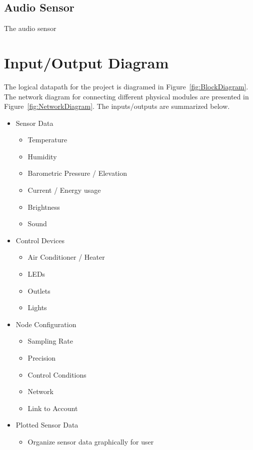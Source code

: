 		\subsection{Audio Sensor}
			The audio sensor %
		
	 \section{Input/Output Diagram}
		 The logical datapath for the project is diagramed in Figure~\ref{fig:BlockDiagram}. The network diagram for connecting different physical modules are presented in Figure~\ref{fig:NetworkDiagram}. The inputs/outputs are summarized below.
		 \begin{itemize}
		 	\item Sensor Data
		 	\begin{itemize}
		 		\item Temperature
		 		\item Humidity
		 		\item Barometric Pressure / Elevation
		 		\item Current / Energy usage
		 		\item Brightness
		 		\item Sound
		 	\end{itemize}
		 	\item Control Devices
		 	\begin{itemize}
		 		\item Air Conditioner / Heater
		 		\item LEDs
		 		\item Outlets
		 		\item Lights
		 	\end{itemize}
		 	\item Node Configuration
		 	\begin{itemize}
		 		\item Sampling Rate
		 		\item Precision
		 		\item Control Conditions
		 		\item Network
		 		\item Link to Account
		 	\end{itemize}
		 	\item Plotted Sensor Data
		 	\begin{itemize}
		 		\item Organize sensor data graphically for user

\end{itemize}
\end{itemize}
